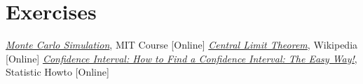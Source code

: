 \section*{Exercises}


\begin{thebibliography}{9}
\href{https://www.youtube.com/watch?v=OgO1gpXSUzU}{\emph{Monte Carlo Simulation}}, MIT Course [Online]
 \href{https://en.wikipedia.org/wiki/Central_limit_theorem}{\emph{Central Limit Theorem}}, Wikipedia [Online]
\href{https://www.statisticshowto.com/probability-and-statistics/confidence-interval}{\emph{Confidence Interval: How to Find a Confidence Interval: The Easy Way!}}, Statistic Howto [Online]
\end{thebibliography}









